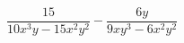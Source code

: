 \begin{ex}
	\begin{condition}
		\( \dfrac{15}{10x^3y-15x^2y^2}-\dfrac{6y}{9xy^3-6x^2y^2} \)
	\end{condition}
\end{ex}